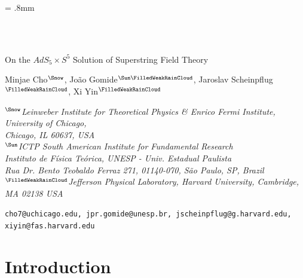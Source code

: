 \documentclass[12pt]{article}
\numberwithin{equation}{section}
\renewcommand{\title}[1]{\vbox{\center\LARGE{#1}}\vspace{5mm}}
\renewcommand{\author}[1]{\vbox{\center#1}\vspace{5mm}}
\newcommand{\address}[1]{\vbox{\center\em#1}}
\newcommand{\email}[1]{\vbox{\center\tt#1}\vspace{5mm}}
\begin{document}
\unitlength = .8mm

\begin{titlepage}

\begin{center}

\hfill \\
\hfill \\
\vskip 1cm

\title{On the $AdS_5\times S^5$ Solution of Superstring Field Theory}

\author{Minjae Cho$^{\text{\Snow}}$, Jo\~ao Gomide$^{\text{\Sun}\text{\FilledWeakRainCloud}}$, Jaroslav Scheinpflug${}^{\text{\FilledWeakRainCloud}}$, Xi Yin${}^{\text{\FilledWeakRainCloud}}$}

\address{$^{\text{\Snow}}$Leinweber Institute for Theoretical Physics \& Enrico Fermi Institute, University of Chicago,\\ Chicago, IL 60637, USA
			\\
		$^{\text{\Sun}}$ICTP South American Institute for Fundamental Research
		\\
Instituto de Física Teórica, UNESP - Univ. Estadual Paulista
\\
Rua Dr. Bento Teobaldo Ferraz 271, 01140-070, São Paulo, SP, Brazil
\\
${}^{\text{\FilledWeakRainCloud}}$Jefferson Physical Laboratory, Harvard University,
Cambridge, MA 02138 USA
}

\email{cho7@uchicago.edu, jpr.gomide@unesp.br, jscheinpflug@g.harvard.edu, xiyin@fas.harvard.edu}

\end{center}

\vfill

\end{titlepage}

\eject

\begingroup
\hypersetup{linkcolor=black}

\tableofcontents

\endgroup


\section{Introduction}
\end{document}
